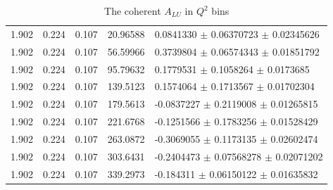 \begin{table}[!h]
\begin{center}
\begin{tabular}{||l|l|l|l|l||}
         1.902 & 0.224 & 0.107 &  20.96588   &    0.0841330  $\pm$   0.06370723  $\pm$   0.02345626 \\
         1.902 & 0.224 & 0.107 &  56.59966   &    0.3739804  $\pm$   0.06574343  $\pm$   0.01851792 \\
         1.902 & 0.224 & 0.107 &  95.79632   &    0.1779531  $\pm$   0.1058264   $\pm$   0.0173685  \\
         1.902 & 0.224 & 0.107 &  139.5123   &    0.1574064  $\pm$   0.1713567   $\pm$   0.01702304 \\
         1.902 & 0.224 & 0.107 &  179.5613   &   -0.0837227  $\pm$   0.2119008   $\pm$   0.01265815 \\
         1.902 & 0.224 & 0.107 &  221.6768   &   -0.1251566  $\pm$   0.1783256   $\pm$   0.01528429 \\
         1.902 & 0.224 & 0.107 &  263.0872   &   -0.3069055  $\pm$   0.1173135   $\pm$   0.02602474 \\
         1.902 & 0.224 & 0.107 &  303.6431   &   -0.2404473  $\pm$   0.07568278  $\pm$   0.02071202 \\
         1.902 & 0.224 & 0.107 &  339.2973   &   -0.184311   $\pm$   0.06150122  $\pm$   0.01635832 \\
      \hline 
      \hline
      \end{tabular}
      \caption{ The coherent $A_{LU}$ in $Q^2$ bins}
      \label{table:Coh_Q2_BSA}
   \end{center}
\end{table}                    

